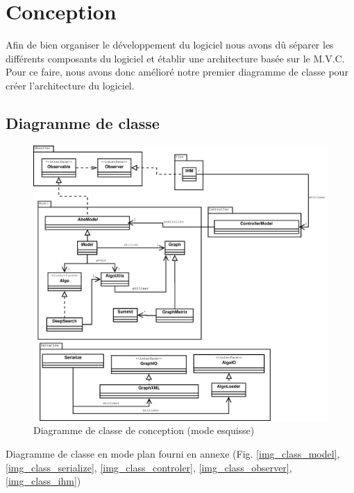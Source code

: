 \documentclass[11pt,a4paper]{article}
\begin{document}
	\section{Conception}
	
		Afin de bien organiser le développement du logiciel nous avons dû séparer les différents composants du logiciel et établir une architecture basée sur le M.V.C. Pour ce faire, nous avons donc amélioré notre premier diagramme de classe pour créer l'architecture du logiciel.
		\subsection{Diagramme de classe}
			\begin{figure}[htbp]
				\begin{center}
					\includegraphics[scale=0.30]{class_esquisse.eps}
				\end{center}
				\caption{Diagramme de classe de conception (mode esquisse)}
				\label{img_class_esquisse}
			\end{figure}
			Diagramme de classe en mode plan fourni en annexe (Fig. \ref{img_class_model}, \ref{img_class_serialize}, \ref{img_class_controler}, \ref{img_class_observer}, \ref{img_class_ihm})
				
		\newpage
\end{document}
